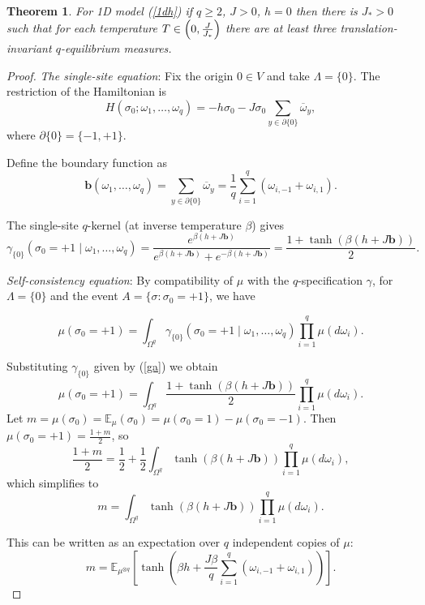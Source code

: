 \documentclass[10pt,a4paper]{amsart}
\newtheorem{thm}{Theorem}
\begin{document}
\begin{thm}\label{tt3} For 1D model (\ref{1dh}) if $q\geq 2$, $J>0$, $h=0$ then there is $J_*>0$ such that for each temperature $T \in \left(0, {J\over J_*}\right)$ there are at least three translation-invariant $q$-equilibrium measures.
\end{thm}

\begin{proof} 
{\it The single-site equation}:   Fix the origin $0 \in V$ and take $\Lambda = \{0\}$.
The restriction of the Hamiltonian is
$$
H(\sigma_0; \omega_1, \dots, \omega_q) = -h \sigma_0 - J \sigma_0 \sum_{y \in \partial\{0\}} \overline{\omega}_y,
$$
where $ \partial\{0\} = \{-1, +1\} $. 

Define the boundary function as
$$
\mathbf{b}(\omega_1, \dots, \omega_q) = \sum_{y \in \partial\{0\}} \overline{\omega}_y = \frac{1}{q} \sum_{i=1}^q (\omega_{i,-1} + \omega_{i,1}).
$$

The single-site $ q $-kernel (at inverse temperature $ \beta $) gives 
\begin{equation}\label{ga}
\gamma_{\{0\}}(\sigma_0 = +1 \mid \omega_1, \dots, \omega_q) = \frac{e^{\beta(h + J \mathbf{b})}}{e^{\beta(h + J \mathbf{b})} + e^{-\beta(h + J \mathbf{b})}} = \frac{1 + \tanh(\beta(h + J \mathbf{b}))}{2}.
\end{equation}

{\it Self-consistency equation}:
By compatibility of $\mu$ with the $ q $-specification $ \gamma $, for $ \Lambda = \{0\} $ and the event $ A = \{\sigma : \sigma_0 = +1\} $, we have

$$
\mu(\sigma_0 = +1) = \int_{\Omega^q} \gamma_{\{0\}}(\sigma_0 = +1 \mid \omega_1, \dots, \omega_q) \prod_{i=1}^q \mu(d\omega_i).
$$

Substituting $\gamma_{\{0\}}$ given by (\ref{ga}) we obtain
$$
\mu(\sigma_0 = +1) = \int_{\Omega^q} \frac{1 + \tanh(\beta(h + J \mathbf{b}))}{2} \prod_{i=1}^q \mu(d\omega_i).
$$
Let $ m = \mu(\sigma_0) =\mathbb E_\mu(\sigma_0)=\mu(\sigma_0=1)-\mu(\sigma_0=-1)$. Then $ \mu(\sigma_0 = +1) = \frac{1 + m}{2} $, so
$$
\frac{1 + m}{2} = \frac{1}{2} + \frac{1}{2} \int_{\Omega^q} \tanh(\beta(h + J \mathbf{b})) \prod_{i=1}^q \mu(d\omega_i),
$$
which simplifies to
$$
m = \int_{\Omega^q} \tanh(\beta(h + J \mathbf{b})) \prod_{i=1}^q \mu(d\omega_i). 
$$

This can be written as an expectation over $q$ independent copies of $\mu$:
\begin{equation}\label{Eq}
m = \mathbb{E}_{\mu^{\otimes q}} \left[ \tanh\left( \beta h + \frac{J\beta}{q} \sum_{i=1}^q (\omega_{i,-1} + \omega_{i,1}) \right) \right].
\end{equation}


\end{proof}
\end{document}
